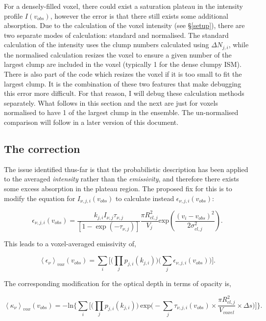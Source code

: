 \documentclass[a4paper]{article}
\begin{document}
    For a densely-filled voxel, there could exist a saturation plateau in the intensity profile \(I(v_{obs})\), however the error is that there still exists some additional absorption.
    Due to the calculation of the voxel intensity (see \S \ref{setup}), there are two separate modes of calculation: standard and normalised.
    The standard calculation of the intensity uses the clump numbers calculated using \(\Delta N_{j,i}\), while the normalised calculation resizes the voxel to ensure a given number of the largest clump are included in the voxel (typically 1 for the dense clumpy ISM).
    There is also part of the code which resizes the voxel if it is too small to fit the largest clump.
    It is the combination of these two features that make debugging this error more difficult.
    For that reason, I will debug these calculation methods separately.
    What follows in this section and the next are just for voxels normalised to have 1 of the largest clump in the ensemble.
    The un-normalised comparison will follow in a later version of this document.

    \subsection{The correction}

    The issue identified thus-far is that the probabilistic description has been applied to the averaged \textit{intensity} rather than the \textit{emissivity}, and therefore there exists some excess absorption in the plateau region.
    The proposed fix for this is to modify the equation for \(I_{\nu, j, i} (v_{obs})\) to calculate instead \(\epsilon_{\nu, j, i} (v_{obs})\):

    \[
    \epsilon_{\nu,j,i} (v_{obs}) = \frac{k_{j,i} I_{\nu,j} \tau_{\nu,j}}{\left[ 1 - \exp(- \tau_{\nu,j}) \right]} \frac{\pi R_{cl,j}^2}{V_{j}} \mathrm{exp} \left( \frac{(v_i-v_{obs})^2}{2\sigma_{cl,j}^2} \right).
    \]

    This leads to a voxel-averaged emissivity of,

    \[
    \left< \epsilon_\nu \right>_{vox} (v_{obs}) = \sum_i \bigg[ \Big( \prod_j p_{j,i}(k_{j,i}) \Big) \Big( \sum_j \epsilon_{\nu,j,i} (v_{obs}) \Big) \bigg].
    \]

    The corresponding modification for the optical depth in terms of opacity is,

    \[
    \left< \kappa_\nu \right>_{vox} (v_{obs}) = -\mathrm{ln} \Bigg\{ \sum_i \bigg[ \Big( \prod_j p_{j,i}(k_{j,i}) \Big) \ \mathrm{exp} \Big( - \sum_j \tau_{\nu,j,i} (v_{obs}) \times \frac{\pi R_{cl,j}^2}{V_{voxel}} \times \Delta s \Big) \bigg] \Bigg\}.
    \]
\end{document}
